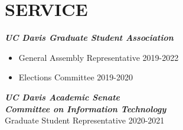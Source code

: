 \documentclass[overlapped]{res}
\begin{document}
\begin{resume}
\begin{itemize}
                \end{itemize}
\section{SERVICE}
                {\sl \textbf{UC Davis Graduate Student Association}} \\
                
                \begin{itemize}
                    \item General Assembly Representative \hfill 2019-2022
                    \item Elections Committee \hfill 2019-2020
                \end{itemize} 

                {\sl \textbf{UC Davis Academic Senate \\ Committee on Information Technology}} \\
                Graduate Student Representative \hfill 2020-2021





                

                


\end{resume}
\end{document}
